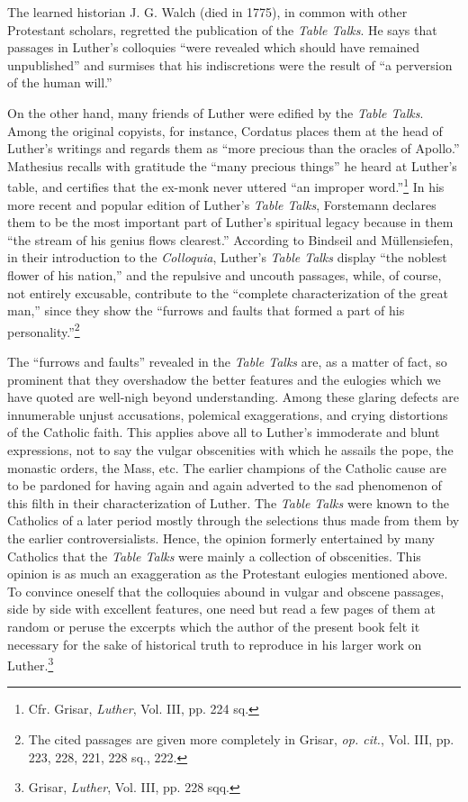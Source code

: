 The learned historian J. G. Walch (died in 1775), in common with
other Protestant scholars, regretted the publication of the \textit{Table Talks}.
He says that passages in Luther’s colloquies “were revealed which
should have remained unpublished” and surmises that his indiscretions
were the result of “a perversion of the human will.”

On the other hand, many friends of Luther were edified by the
\textit{Table Talks}. Among the original copyists, for instance, Cordatus
places them at the head of Luther’s writings and regards them as
“more precious than the oracles of Apollo.” Mathesius recalls with
gratitude the “many precious things” he heard at Luther’s table, and
certifies that the ex-monk never uttered “an improper word.”\footnote{Cfr. Grisar, \textit{Luther}, Vol. III, pp. 224 sq.}
In his more recent and popular edition of Luther’s \textit{Table Talks}, Forstemann
declares them to be the most important part of Luther’s spiritual legacy
because in them “the stream of his genius flows clearest.”
According to Bindseil and Müllensiefen, in their introduction to the
\textit{Colloquia}, Luther’s \textit{Table Talks} display “the noblest flower of his
nation,” and the repulsive and uncouth passages, while, of course,
not entirely excusable, contribute to the “complete characterization
of the great man,” since they show the “furrows and faults that
formed a part of his personality.”\footnote
{The cited passages are given more completely in Grisar, \textit{op. cit.}, Vol. III, pp. 223, 228,
221, 228 sq., 222.}

The “furrows and faults” revealed in the \textit{Table Talks} are, as a matter
of fact, so prominent that they overshadow the better features and
the eulogies which we have quoted are well-nigh beyond understanding.
Among these glaring defects are innumerable unjust accusations,
polemical exaggerations, and crying distortions of the Catholic
faith. This applies above all to Luther’s immoderate and blunt
expressions, not to say the vulgar obscenities with which he assails
the pope, the monastic orders, the Mass, etc. The earlier champions
of the Catholic cause are to be pardoned for having again and
again adverted to the sad phenomenon of this filth in their characterization
of Luther. The \textit{Table Talks} were known to the Catholics
of a later period mostly through the selections thus made from them
by the earlier controversialists. Hence, the opinion formerly entertained
by many Catholics that the \textit{Table Talks} were mainly a collection
of obscenities. This opinion is as much an exaggeration as
the Protestant eulogies mentioned above. To convince oneself that
the colloquies abound in vulgar and obscene passages, side by side
with excellent features, one need but read a few pages of them at random
or peruse the excerpts which the author of the present book
felt it necessary for the sake of historical truth to reproduce in his
larger work on Luther.\footnote{Grisar, \textit{Luther}, Vol. III, pp. 228 sqq.}

